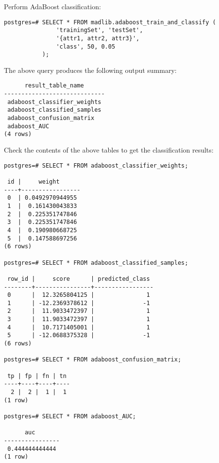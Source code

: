 {\raggedleft Perform AdaBoost classification:}

\begin{verbatim}
postgres=# SELECT * FROM madlib.adaboost_train_and_classify (
               'trainingSet', 'testSet', 
               '{attr1, attr2, attr3}', 
               'class', 50, 0.05
           );
\end{verbatim}

{\raggedleft The above query produces the following output summary:}

\begin{verbatim}
      result_table_name      
-----------------------------
 adaboost_classifier_weights
 adaboost_classified_samples
 adaboost_confusion_matrix
 adaboost_AUC
(4 rows)
\end{verbatim}

{\raggedleft Check the contents of the above tables to get the classification results:}

\begin{verbatim}
postgres=# SELECT * FROM adaboost_classifier_weights;

 id |     weight      
----+-----------------
 0  | 0.0492970944955
 1  |  0.161430043833
 2  |  0.225351747846
 3  |  0.225351747846
 4  |  0.190980668725
 5  |  0.147588697256
(6 rows)

postgres=# SELECT * FROM adaboost_classified_samples;

 row_id |     score      | predicted_class 
--------+----------------+-----------------
 0      |  12.3265804125 |               1
 1      | -12.2369378612 |              -1
 2      |  11.9033472397 |               1
 3      |  11.9033472397 |               1
 4      |  10.7171405001 |               1
 5      | -12.0688375328 |              -1
(6 rows)

postgres=# SELECT * FROM adaboost_confusion_matrix;

 tp | fp | fn | tn 
----+----+----+----
  2 |  2 |  1 |  1
(1 row)

postgres=# SELECT * FROM adaboost_AUC;

      auc       
----------------
 0.444444444444
(1 row)

\end{verbatim}